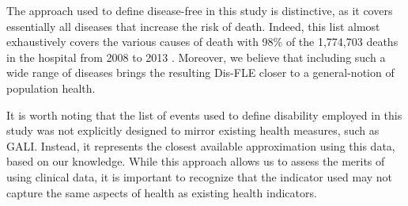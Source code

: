 \documentclass[risks,article,submit,moreauthors,pdftex]{Definitions/mdpi}
\begin{document}
The approach used to define disease-free in this study is distinctive,
as it covers essentially all diseases that increase the risk of death.
Indeed, this list almost exhaustively covers the various causes of death
with 98\% of the 1,774,703 deaths in the hospital from 2008 to 2013
\citep{schwarzinger_etude_2018}. Moreover, we believe that including
such a wide range of diseases brings the resulting Dis-FLE closer to a
general-notion of population health.

It is worth noting that the list of events used to define disability
employed in this study was not explicitly designed to mirror existing
health measures, such as GALI. Instead, it represents the closest
available approximation using this data, based on our knowledge. While
this approach allows us to assess the merits of using clinical data, it
is important to recognize that the indicator used may not capture the
same aspects of health as existing health indicators.
\end{document}
